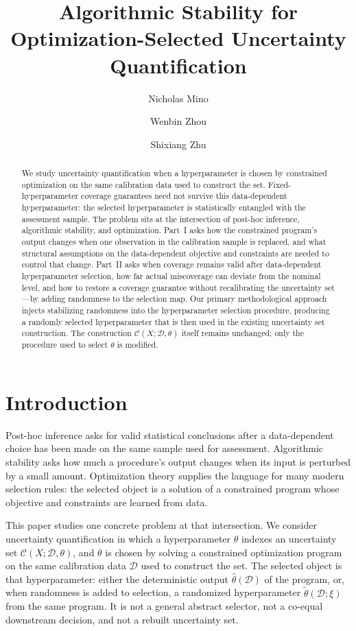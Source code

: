 \documentclass[12pt]{article}
\title{Algorithmic Stability for Optimization-Selected Uncertainty Quantification}
\author[1]{Nicholas Mino}
\author[1]{Wenbin Zhou}
\author[1]{Shixiang Zhu}
\affil[1]{Carnegie Mellon University}
\date{}
\theoremstyle{plain}
\begin{document}
\maketitle

\begin{abstract}
We study uncertainty quantification when a hyperparameter is chosen by constrained optimization on the same calibration data used to construct the set.
Fixed-hyperparameter coverage guarantees need not survive this data-dependent hyperparameter: the selected hyperparameter is statistically entangled with the assessment sample.
The problem sits at the intersection of post-hoc inference, algorithmic stability, and optimization.
Part~I asks how the constrained program's output changes when one observation in the calibration sample is replaced, and what structural assumptions on the data-dependent objective and constraints are needed to control that change.
Part~II asks when coverage remains valid after data-dependent hyperparameter selection, how far actual miscoverage can deviate from the nominal level, and how to restore a coverage guarantee without recalibrating the uncertainty set---by adding randomness to the selection map.
Our primary methodological approach injects stabilizing randomness into the hyperparameter selection procedure, producing a randomly selected hyperparameter that is then used in the existing uncertainty set construction.
The construction $\mathcal{C}(X;\mathcal{D},\theta)$ itself remains unchanged; only the procedure used to select $\theta$ is modified.
\end{abstract}

\section{Introduction}
\label{sec:intro}

Post-hoc inference asks for valid statistical conclusions after a data-dependent choice has been made on the same sample used for assessment.
Algorithmic stability asks how much a procedure's output changes when its input is perturbed by a small amount.
Optimization theory supplies the language for many modern selection rules: the selected object is a solution of a constrained program whose objective and constraints are learned from data.

This paper studies one concrete problem at that intersection.
We consider uncertainty quantification in which a hyperparameter $\theta$ indexes an uncertainty set $\mathcal{C}(X;\mathcal{D},\theta)$, and $\theta$ is chosen by solving a constrained optimization program on the same calibration data $\mathcal{D}$ used to construct the set.
The selected object is that hyperparameter: either the deterministic output $\hat\theta(\mathcal{D})$ of the program, or, when randomness is added to selection, a randomized hyperparameter $\widetilde\theta(\mathcal{D};\xi)$ from the same program.
It is not a general abstract selector, not a co-equal downstream decision, and not a rebuilt uncertainty set.
\end{document}
